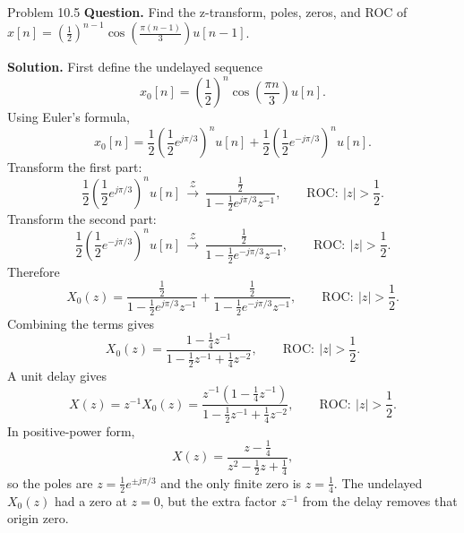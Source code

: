 \documentclass[10pt]{article}
\newcommand{\ROC}{\mathrm{ROC}}
\newcommand{\ZT}{\mathcal{Z}}
\newcommand{\Prompt}[1]{\textbf{Question.} #1}
\newcommand{\SketchLabel}{\tcblower\textbf{Solution.}}
\newcommand{\Zpair}[2]{#1\,\mathrel{\overset{\ZT}{\longrightarrow}}\,#2}
\begin{document}
\begin{examplebox}{Problem 10.5}
  \Prompt{Find the z-transform, poles, zeros, and ROC of \(x[n]=\left(\frac12\right)^{n-1}\cos\!\left(\frac{\pi(n-1)}{3}\right)u[n-1]\).}

  \medskip
  \SketchLabel{}
  First define the undelayed sequence
  \[
    x_0[n]=\left(\frac12\right)^n\cos\!\left(\frac{\pi n}{3}\right)u[n].
  \]
  Using Euler's formula,
  \[
    x_0[n]=\frac12\!\left(\frac12 e^{j\pi/3}\right)^{\!n}u[n]
    +\frac12\!\left(\frac12 e^{-j\pi/3}\right)^{\!n}u[n].
  \]
  Transform the first part:
  \[
    \Zpair{\frac12\!\left(\frac12 e^{j\pi/3}\right)^{\!n}u[n]}
    {\frac{\frac12}{1-\frac12 e^{j\pi/3}z^{-1}}},
    \qquad
    \ROC:\ |z|>\frac12.
  \]
  Transform the second part:
  \[
    \Zpair{\frac12\!\left(\frac12 e^{-j\pi/3}\right)^{\!n}u[n]}
    {\frac{\frac12}{1-\frac12 e^{-j\pi/3}z^{-1}}},
    \qquad
    \ROC:\ |z|>\frac12.
  \]
  Therefore
  \[
    X_0(z)=\frac{\frac12}{1-\frac12 e^{j\pi/3}z^{-1}}
    +\frac{\frac12}{1-\frac12 e^{-j\pi/3}z^{-1}},
    \qquad
    \ROC:\ |z|>\frac12.
  \]
  Combining the terms gives
  \[
    X_0(z)=\frac{1-\frac14 z^{-1}}{1-\frac12 z^{-1}+\frac14 z^{-2}},
    \qquad
    \ROC:\ |z|>\frac12.
  \]
  A unit delay gives
  \[
    X(z)=z^{-1}X_0(z)
    =\frac{z^{-1}\left(1-\frac14 z^{-1}\right)}{1-\frac12 z^{-1}+\frac14 z^{-2}},
    \qquad
    \ROC:\ |z|>\frac12.
  \]
  In positive-power form,
  \[
    X(z)=\frac{z-\frac14}{z^2-\frac12 z+\frac14},
  \]
  so the poles are \(z=\frac12e^{\pm j\pi/3}\) and the only finite zero is \(z=\frac14\).
  The undelayed \(X_0(z)\) had a zero at \(z=0\), but the extra factor \(z^{-1}\) from the delay removes that origin zero.

  \begin{center}
  \end{center}
\end{examplebox}
\end{document}

